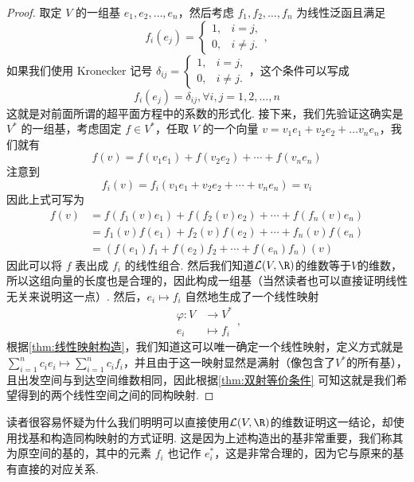 \begin{proof}
    取定 $V$ 的一组基 $e_1, e_2, \ldots, e_n$，然后考虑 $f_1, f_2, \ldots, f_n$ 为线性泛函且满足
    \[f_i(e_j) = \begin{cases}
            1, & i = j,    \\
            0, & i \neq j.
        \end{cases},\]
    如果我们使用 Kronecker 记号 $\delta_{ij}=\begin{cases}
            1, & i = j,    \\
            0, & i \neq j.
        \end{cases}$，这个条件可以写成
    \[f_i(e_j) = \delta_{ij}, \forall i, j = 1, 2, \ldots, n\]
    这就是对前面所谓的超平面方程中的系数的形式化. 接下来，我们先验证这确实是 $V^*$ 的一组基，考虑固定 $f \in V^*$，任取 $V$ 的一个向量 $v = v_1 e_1 + v_2 e_2 + \ldots v_n e_n$，我们就有
    \[f(v) = f(v_1 e_1) + f(v_2 e_2) + \cdots + f(v_n e_n)\]
    注意到
    \[f_i(v) = f_i (v_1 e_1 + v_2 e_2 + \cdots + v_n e_n) = v_i\]
    因此上式可写为
    \begin{align*}
        f(v) & = f(f_1(v) e_1) + f(f_2(v) e_2) + \cdots + f(f_n(v) e_n) \\
             & = f_1(v) f(e_1) + f_2(v) f(e_2) + \cdots + f_n(v) f(e_n) \\
             & = (f(e_1) f_1 + f(e_2) f_2 + \cdots + f(e_n) f_n)(v)
    \end{align*}
    因此可以将 $f$ 表出成 $f_i$ 的线性组合. 然后我们知道$\mathcal{L}(V, \R)$的维数等于$V$的维数，所以这组向量的长度也是合理的，因此构成一组基（当然读者也可以直接证明线性无关来说明这一点）. 然后，$e_i \mapsto f_i$ 自然地生成了一个线性映射
    \begin{equation*}
        \begin{aligned}
            \varphi: V & \to V^*     \\
            e_i        & \mapsto f_i
        \end{aligned},
    \end{equation*}
    根据\autoref{thm:线性映射构造}，我们知道这可以唯一确定一个线性映射，定义方式就是$\sum\limits_{i=1}^nc_ie_i \mapsto\sum\limits_{i=1}^nc_if_i$，并且由于这一映射显然是满射（像包含了$V^*$的所有基），且出发空间与到达空间维数相同，因此根据\autoref{thm:双射等价条件} 可知这就是我们希望得到的两个线性空间之间的同构映射.
\end{proof}

读者很容易怀疑为什么我们明明可以直接使用$\mathcal{L}(V, \R)$的维数证明这一结论，却使用找基和构造同构映射的方式证明. 这是因为上述构造出的基非常重要，我们称其为原空间的基的，其中的元素 $f_i$ 也记作 $e^*_i$，这是非常合理的，因为它与原来的基有直接的对应关系.

